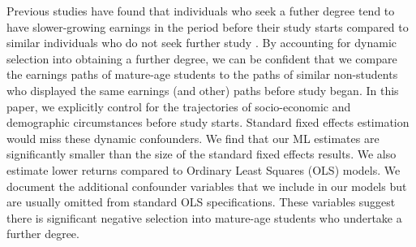 \documentclass[12pt, a4paper]{article}
\begin{document}
Previous studies have found that individuals who seek a futher degree tend to have slower-growing earnings in the period before their study starts compared to similar individuals who do not seek further study \citep{jacobson2005,dynarski2016,dynarski2018}. By accounting for dynamic selection into obtaining a further degree, we can be confident that we compare the earnings paths of mature-age students to the paths of similar non-students who displayed the same earnings (and other) paths before study began. In this paper, we explicitly control for the trajectories of socio-economic and demographic circumstances before study starts. Standard fixed effects estimation would miss these dynamic confounders. We find that our ML estimates are significantly smaller than the size of the standard fixed effects results. We also estimate lower returns compared to Ordinary Least Squares (OLS) models. We document the additional confounder variables that we include in our models but are usually omitted from standard OLS specifications. These variables suggest there is significant negative selection into mature-age students who undertake a further degree.
\end{document}
